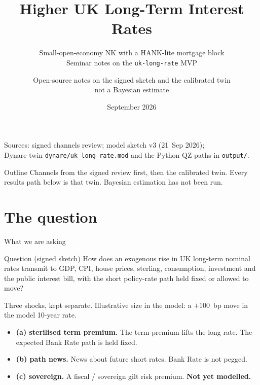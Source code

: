 \documentclass[11pt,aspectratio=169]{beamer}
\title[UK long rates]{Higher UK Long-Term Interest Rates}
\subtitle{\texorpdfstring{Small-open-economy NK with a HANK-lite mortgage block\\
{\normalsize Seminar notes on the \texttt{uk-long-rate} MVP}}{UK long-rate seminar notes}}
\author[Prototype slides]{\texorpdfstring{Open-source notes on the signed sketch and the calibrated twin\\
{\small not a Bayesian estimate}}{Open-source prototype slides (calibrated, not estimated)}}
\institute[MacroModellerBot]{\texttt{uk-long-rate/} in MacroModellerBot}
\date{September 2026}
\begin{document}
\begin{frame}[plain]
  \titlepage
  \vspace{-1.1em}
  \begin{center}
    {\footnotesize
    Sources: signed channels review; model sketch v3 (21~Sep 2026);\\
    Dynare twin \texttt{dynare/uk\_long\_rate.mod} and the Python QZ paths in \texttt{output/}.}
  \end{center}
\end{frame}

\begin{frame}{Outline}
  \tableofcontents
  \vspace{0.6em}
  {\footnotesize Channels from the signed review first, then the calibrated
  twin. Every results path below is that twin.
  Bayesian estimation has not been run.}
\end{frame}

\section{The question}
\begin{frame}{What we are asking}
  \begin{block}{Question (signed sketch)}
    How does an exogenous rise in UK long-term nominal rates transmit
    to GDP, CPI, house prices, sterling, consumption, investment and
    the public interest bill, with the short policy-rate path held
    fixed or allowed to move?
  \end{block}
  \vspace{0.2em}
  Three shocks, kept separate. Illustrative size in the model:
  a $+100$~bp move in the model 10-year rate.
  \begin{itemize}
    \item \textbf{(a) sterilised term premium.}
          The term premium lifts the long rate. The expected Bank Rate
          path is held fixed.
    \item \textbf{(b) path news.}
          News about future short rates. Bank Rate is not pegged.
    \item \textbf{(c) sovereign.}
          A fiscal / sovereign gilt risk premium.
          \textbf{Not yet modelled.}
  \end{itemize}
\end{frame}
\end{document}
